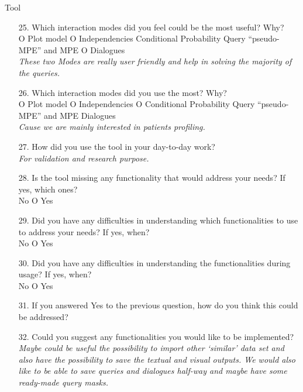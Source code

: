 \begin{mdframed}
	{\Large Tool}
	\begin{enumerate}[resume]
		\item[25.] Which interaction modes did you feel could be the most useful?  Why? \\
		O Plot model O Independencies  Conditional Probability Query  \enquote{pseudo-MPE} and MPE O Dialogues\\
		\textit{These two Modes are really user friendly and help in solving the majority of the queries.}
		\item[26.] Which interaction modes did you use the most?  Why? \\
		O Plot model O Independencies O Conditional Probability Query  \enquote{pseudo-MPE} and MPE  Dialogues\\
		\textit{Cause we are mainly interested in patients profiling.}
		\item[27.] How did you use the tool in your day-to-day work?\\
		\textit{For validation and research purpose.}
		\item[28.] Is the tool missing any functionality that would address your needs?  If yes, which ones? \\
		 No O Yes
		\item[29.] Did you have any difficulties in understanding which functionalities to use to address your needs?  If yes, when? \\
		 No O Yes
		\item[30.] Did you have any difficulties in understanding the functionalities during usage?  If yes, when? \\
		 No O Yes
		\item[31.] If you answered Yes to the previous question, how do you think this could be addressed?
		\item[32.] Could you suggest any functionalities you would like to be implemented?\\
		\textit{Maybe could be useful the possibility to import other `similar' data set and also have the possibility to save the textual and visual outputs.  We would also like to be able to save queries and dialogues half-way and maybe have some ready-made query masks.}
	\end{enumerate}
	\label{ques:tool}
\end{mdframed}

